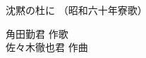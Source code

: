 \documentclass[10pt,b5j]{tarticle} %
\begin{document}
\begin{minipage}[c]{0.7\hsize} %
    \begin{center}
        {\LARGE
            沈黙の杜に %
        }
        {\small 
            （昭和六十年寮歌） %
        }
    \end{center}
\end{minipage}
\begin{minipage}[c]{0.3\hsize} %
    \begin{flushright} %
        角田勤君 作歌\\佐々木徹也君 作曲 %
    \end{flushright}
\end{minipage}
\end{document}
